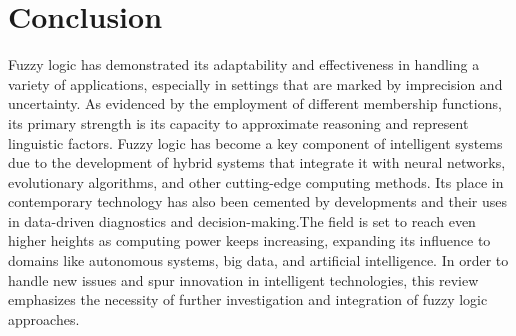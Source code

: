 \documentclass[a4paper,12pt]{report}
\begin{document}
\chapter{Conclusion}
Fuzzy logic has demonstrated its adaptability and effectiveness in handling a variety of applications, especially in settings that are marked by imprecision and uncertainty. As evidenced by the employment of different membership functions, its primary strength is its capacity to approximate reasoning and represent linguistic factors. Fuzzy logic has become a key component of intelligent systems due to the development of hybrid systems that integrate it with neural networks, evolutionary algorithms, and other cutting-edge computing methods. Its place in contemporary technology has also been cemented by developments and their uses in data-driven diagnostics and decision-making.The field is set to reach even higher heights as computing power keeps increasing, expanding its influence to domains like autonomous systems, big data, and artificial intelligence. In order to handle new issues and spur innovation in intelligent technologies, this review emphasizes the necessity of further investigation and integration of fuzzy logic approaches.

\renewcommand{\bibname}{References}




\end{document}
